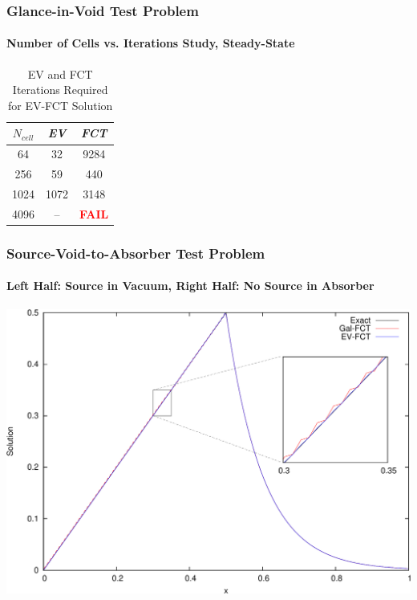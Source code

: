 \begin{frame}
\frametitle{Glance-in-Void Test Problem}
\framesubtitle{Number of Cells vs. Iterations Study, Steady-State}

\begin{center}
\begin{table}[h]
\caption{EV and FCT Iterations Required for EV-FCT Solution}
\begin{tabular}{c c c}\toprule
$N_{cell}$ & \emph{EV} & \emph{FCT}\\\midrule
  64 &   32 & 9284\\
 256 &   59 &  440\\
1024 & 1072 & 3148\\
4096 &   -- & \textcolor{red}{\textbf{FAIL}}\\
\bottomrule\end{tabular}
\end{table}
\end{center}

\end{frame}
\begin{frame}
\frametitle{Source-Void-to-Absorber Test Problem}
\framesubtitle{Left Half: Source in Vacuum, Right Half: No Source in Absorber}

\begin{center}
\includegraphics[height=0.8\textheight]{./figures/sourcevoid_FCT_comparison.pdf}
\end{center}

\end{frame}
